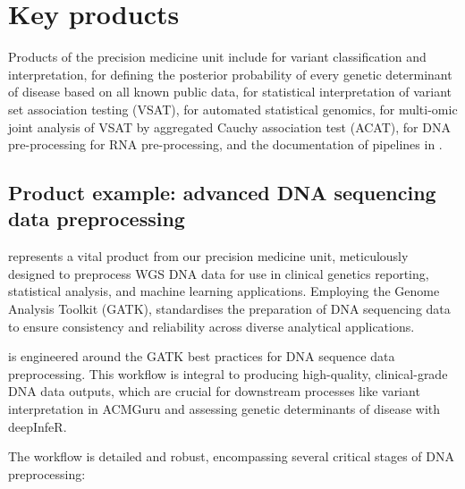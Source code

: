 \section{Key products}

Products of the precision medicine unit include
\acmguru for variant classification and interpretation,
\deepinfer for defining the posterior probability of every genetic determinant of disease based on all known public data,
\archipelago for statistical interpretation of variant set association testing (VSAT),
\skatrbrain for automated statistical genomics,
\macat for multi-omic joint analysis of VSAT by aggregated Cauchy association test (ACAT),
\dnasnake for DNA pre-processing
\rnasnake for RNA pre-processing, 
and the documentation of pipelines in
\pipedevdocdna. 

\subsection{Product example: advanced DNA sequencing data preprocessing}

\dnasnake represents a vital product from our precision medicine unit, meticulously designed to preprocess WGS DNA data for use in clinical genetics reporting, statistical analysis, and machine learning applications. 
Employing the Genome Analysis Toolkit (GATK), \dnasnake standardises the preparation of DNA sequencing data to ensure consistency and reliability across diverse analytical applications.


\dnasnake is engineered around the GATK best practices for DNA sequence data preprocessing. This workflow is integral to producing high-quality, clinical-grade DNA data outputs, which are crucial for downstream processes like variant interpretation in ACMGuru and assessing genetic determinants of disease with deepInfeR.


The \dnasnake workflow is detailed and robust, encompassing several critical stages of DNA preprocessing:

